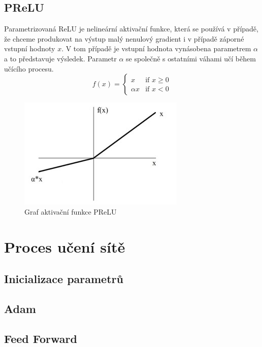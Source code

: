 \subsection{PReLU}
Parametrizovaná ReLU je nelineární aktivační funkce, která se používá v případě, že chceme produkovat na výstup malý nenulový gradient i v případě záporné vstupní hodnoty $x$. V tom případě je vstupní hodnota vynásobena parametrem $\alpha$ a to představuje výsledek. Parametr $\alpha$ se společně s ostatními váhami učí během učícího procesu.
\begin{equation}
  f(x) =
  \begin{cases}
    x & \text{if } x \geq 0 \\
    {\alpha}x & \text{if } x < 0
  \end{cases}
\end{equation}
\begin{figure}[H]
    \centering
    \includegraphics[scale=1]{obrazky-figures/prelu.jpg}
    \caption{\label{fig:prelu}Graf aktivační funkce PReLU}
\end{figure}

\section{Proces učení sítě}

\subsection{Inicializace parametrů}

\subsection*{Adam}


\subsection{Feed Forward}

